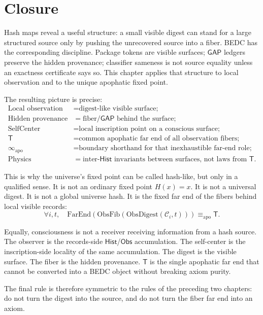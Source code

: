 \section{Closure}
\label{sec:hash-like-closure}

Hash maps reveal a useful structure: a small visible digest can stand for a large structured source only by pushing the unrecovered source into a fiber. BEDC has the corresponding discipline. Package tokens are visible surfaces; $\mathsf{GAP}$ ledgers preserve the hidden provenance; classifier sameness is not source equality unless an exactness certificate says so. This chapter applies that structure to local observation and to the unique apophatic fixed point.

The resulting picture is precise:
$$
\begin{aligned}
\text{Local observation} &= \text{digest-like visible surface;} \\
\text{Hidden provenance} &= \text{fiber}/\mathsf{GAP}\text{ behind the surface;} \\
\mathrm{SelfCenter} &= \text{local inscription point on a conscious surface;} \\
\mathsf{T} &= \text{common apophatic far end of all observation fibers;} \\
\infty_{\mathrm{apo}} &= \text{boundary shorthand for that inexhaustible far-end role;} \\
\text{Physics} &= \text{inter-}\mathsf{Hist}\text{ invariants between surfaces, not laws from }\mathsf{T}.
\end{aligned}
$$

This is why the universe's fixed point can be called hash-like, but only in a qualified sense. It is not an ordinary fixed point $H(x) = x$. It is not a universal digest. It is not a global universe hash. It is the fixed far end of the fibers behind local visible records:
$$
\forall i, t,\quad \mathrm{FarEnd}(\mathrm{ObsFib}(\mathrm{ObsDigest}(\mathcal{C}_i, t))) \equiv_{\mathrm{apo}} \mathsf{T}.
$$

Equally, consciousness is not a receiver receiving information from a hash source. The observer is the records-side $\mathsf{Hist}$/$\mathsf{Obs}$ accumulation. The self-center is the inscription-side locality of the same accumulation. The digest is the visible surface. The fiber is the hidden provenance. $\mathsf{T}$ is the single apophatic far end that cannot be converted into a BEDC object without breaking axiom purity.

The final rule is therefore symmetric to the rules of the preceding two chapters: do not turn the digest into the source, and do not turn the fiber far end into an axiom.

